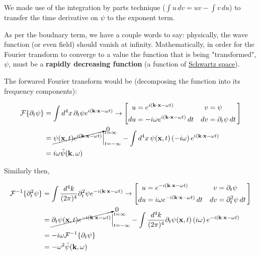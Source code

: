 We made use of the integration by parts technique ($\int u \, dv = uv - \int v \, du$) to transfer the time derivative
on $\psi$ to the exponent term.

As per the boudnary term, we have a couple words to say: physically, the wave function (or even field) should vanish at infinity.
Mathematically, in order for the Fourier transform to converge to a value the function that is being "transformed", $\psi$,
must be a \textbf{rapidly decreasing function} (a function of \href{https://en.wikipedia.org/wiki/Schwartz_space}{Schwartz space}).

The forwared Fourier transform would be (decomposing the function into its frequency components):

\begin{align*}
\mathcal{F}\{ \partial_t \psi \} &=
    \int d^4x\, \partial_t \psi e^{i(\boldsymbol{\mathbf{k}}\cdot\boldsymbol{\mathbf{x}} - \omega t)}
\rightarrow
\left[
    \begin{alignedat}{2}
        u  &= e^{i(\boldsymbol{\mathbf{k}}\cdot\boldsymbol{\mathbf{x}} - \omega t)}                \quad & v  &= \psi \\
        du &= -i\omega e^{i(\boldsymbol{\mathbf{k}}\cdot\boldsymbol{\mathbf{x}} - \omega t)} \, dt  \quad & dv &= \partial_t \psi \, dt
    \end{alignedat}\,
\right] \\
&= \cancelto{0}{ \psi(\boldsymbol{\mathbf{x}}, t) e^{i(\boldsymbol{\mathbf{k}}\cdot\boldsymbol{\mathbf{x}} - \omega t)} } \Big|_{t=-\infty}^{t=\infty}
    - \int d^4x\, \psi(\boldsymbol{\mathbf{x}}, t) \left(-i\omega\right) e^{i(\boldsymbol{\mathbf{k}}\cdot\boldsymbol{\mathbf{x}} - \omega t)} \\
&= i\omega \tilde{\psi} (\boldsymbol{\mathbf{k}}, \omega)
\end{align*}



Similarly then,

\begin{align*}
\mathcal{F}^{-1}\{ \partial_{t}^2 \psi \} &=
    \int \frac{d^4k}{(2\pi)^4} \partial_{t}^{2} \psi e^{-i(\boldsymbol{\mathbf{k}}\cdot\boldsymbol{\mathbf{x}} - \omega t)}
\rightarrow
\left[
    \begin{alignedat}{2}
        u  &= e^{-i(\boldsymbol{\mathbf{k}}\cdot\boldsymbol{\mathbf{x}} - \omega t)}                \quad & v  &= \partial_t \psi \\
        du &= i\omega e^{-i(\boldsymbol{\mathbf{k}}\cdot\boldsymbol{\mathbf{x}} - \omega t)} \, dt  \quad & dv &= \partial_{t}^{2} \psi \, dt
    \end{alignedat}\,
\right] \\
&= \cancelto{0}{ \partial _t \psi(\boldsymbol{\mathbf{x}}, t) e^{-i(\boldsymbol{\mathbf{k}}\cdot\boldsymbol{\mathbf{x}} - \omega t)} } \Big|_{t=-\infty}^{t=\infty}
    - \int \frac{d^4k}{(2\pi)^4} \partial_t \psi(\boldsymbol{\mathbf{x}}, t) \left(i\omega\right) e^{-i(\boldsymbol{\mathbf{k}}\cdot\boldsymbol{\mathbf{x}} - \omega t)} \\
&= -i\omega \mathcal{F}^{-1}\{ \partial_t \psi \} \\
&= - \omega^2 \tilde{\psi} (\boldsymbol{\mathbf{k}}, \omega)
\end{align*}

